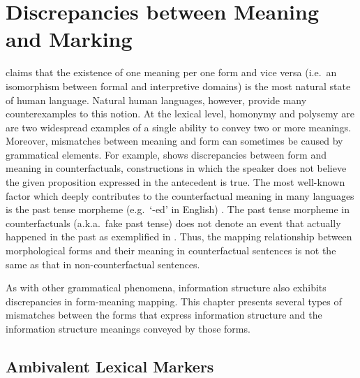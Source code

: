 \chapter{Discrepancies between Meaning and Marking}
\label{chapter5}
\setcounter{enums}{0}

\noindent \citet{bolinger:77} claims that the existence of one meaning
per one form and vice versa (i.e.\ an isomorphism between formal and
interpretive domains) is the most natural state of human language.
Natural human languages, however, provide many counterexamples to this
notion.  At the lexical level, homonymy and polysemy are are two
widespread examples of a single ability to convey two or more
meanings.  Moreover, mismatches between meaning and form can sometimes
be caused by grammatical elements. For example,  shows
discrepancies between form and meaning in counterfactuals,
constructions in which the speaker does not believe the given
proposition expressed in the antecedent is true. The most well-known
factor which deeply contributes to the counterfactual meaning in many
languages is the past tense morpheme (e.g.\ `-ed' in English)
\citep{iatridou:00}.  The past tense morpheme in counterfactuals
(a.k.a.\ fake past tense) does not denote an event that actually
happened in the past as exemplified in . Thus, the
mapping relationship between morphological forms and their meaning in
counterfactual sentences is not the same as that in non-counterfactual
sentences.



As with other grammatical phenomena, information structure also
exhibits discrepancies in form-meaning mapping. This chapter presents
several types of mismatches between the forms that express information
structure and the information structure meanings conveyed by those
forms.





\section{Ambivalent Lexical Markers}
\label{5:sec:lex}


